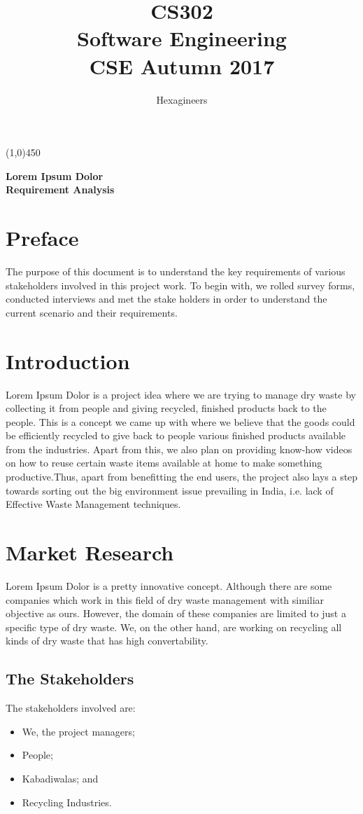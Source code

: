 \documentclass{article}
\title{\textbf{CS302}\\\HUGE Software Engineering\\
\LARGE CSE\hspace{\labelsep}\textbullet\hspace{\labelsep} Autumn 2017
}
\author{Hexagineers}
\begin{document}
\maketitle
\line(1,0){450}

\begin{center}
\textbf{\Huge Lorem Ipsum Dolor\\\Large Requirement Analysis}

\end{center}
\newpage
\tableofcontents
\newpage
\section{Preface}
\par The purpose of this document is to understand the key requirements of various stakeholders involved in this project work. To begin with, we rolled survey forms, conducted interviews and met the stake holders in order to understand the current scenario and their requirements. 
\newpage
\section{Introduction}
\par Lorem Ipsum Dolor is a project idea where we are trying to manage dry waste by collecting it from people and giving recycled, finished products back to the people. This is a concept we came up with where we believe that the goods could be efficiently recycled to give back to people various finished products available from the industries. 
Apart from this, we also plan on providing know-how videos on how to reuse certain waste items available at home to make something productive.Thus, apart from benefitting the end users, the project also lays a step towards sorting out the big environment issue prevailing in India, i.e. lack of Effective Waste Management techniques.

\section{Market Research}
\par Lorem Ipsum Dolor is a pretty innovative concept. Although there are some companies which work in this field of dry waste management with similiar objective as ours. However, the domain of these companies are limited to just a specific type of dry waste.
We, on the other hand, are working on recycling all kinds of dry waste that has high convertability. 

\subsection{The Stakeholders}
\par The stakeholders involved are:
\begin{itemize}
    \item We, the project managers;
    \item People;
    \item Kabadiwalas; and
    \item Recycling Industries.
\end{itemize}
\end{document}
